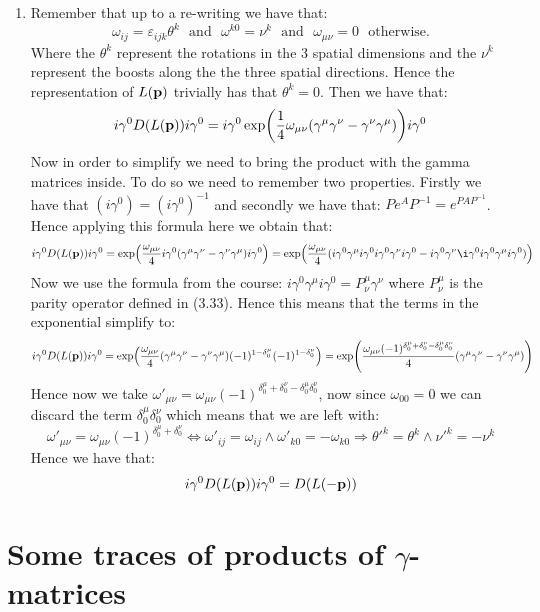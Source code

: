 \documentclass[10pt,a4paper]{article}
\begin{document}
\begin{enumerate}


\item Remember that up to a re-writing we have that:
\[
\omega_{ij} = \varepsilon_{i j k} \theta^k \mbox{~~and~~} \omega^{k0} = \nu^k \mbox{~~and~~} \omega_{\mu \nu} = 0 \mbox{~~otherwise.}
\]
Where the $\theta^k$ represent the rotations in the 3 spatial dimensions and the $\nu^k$ represent the boosts along the the three spatial directions. Hence the representation of $L(\vb{p})$ trivially has that $\theta^k = 0$. Then we have that:
\[
i \gamma^0 D(L(\vb{p})) i \gamma^0 = i \gamma^0 \exp( \frac{1}{4} \omega_{\mu \nu} (\gamma^\mu \gamma^\nu - \gamma^\nu \gamma^\mu) ) i \gamma^0
\] 
Now in order to simplify we need to bring the product with the gamma matrices inside. To do so we need to remember two properties. Firstly we have that $(i\gamma^0) = (i\gamma^0)^{-1}$ and secondly we have that: $P e^A P^{-1} = e^{P A P^{-1}}$. Hence applying this formula here we obtain that:
\[
i\gamma^0 D(L(\vb{p})) i \gamma^0 = \exp(\frac{\omega_{\mu \nu}}{4} i\gamma^0 (\gamma^\mu \gamma^\nu - \gamma^\nu \gamma^\mu) i\gamma^0   ) = \exp(\frac{\omega_{\mu \nu}}{4} (i \gamma^0 \gamma^\mu i \gamma^0 i \gamma^0 \gamma^\nu i \gamma^0 - i\gamma^0\gamma^\nu \i \gamma^ 0 i \gamma^0 \gamma^\mu i\gamma^0)   )
\] 
Now we use the formula from the course: $i\gamma^0 \gamma^\mu i \gamma^0 = P^\mu_\nu \gamma^\nu$ where $P^\mu_\nu$ is the parity operator defined in (3.33). Hence this means that the terms in the exponential simplify to:
\[
i\gamma^0 D(L(\vb{p})) i \gamma^0 = \exp(\frac{\omega_{\mu \nu}}{4}  (\gamma^\mu \gamma^\nu - \gamma^\nu \gamma^\mu) (-1)^{1 - \delta^\mu_0}  (-1)^{1 - \delta^\nu_0}) = \exp(\frac{\omega_{\mu \nu}(-1)^{\delta^\mu_0 + \delta^\nu_0 - \delta^\mu_0 \delta^\nu_0} }{4}  (\gamma^\mu \gamma^\nu - \gamma^\nu \gamma^\mu)) 
\]
Hence now we take $\omega'_{\mu \nu} = \omega_{\mu \nu}(-1)^{\delta^\mu_0 + \delta^\nu_0 - \delta^\mu_0 \delta^\nu_0}$, now since $\omega_{00} = 0$ we can discard the term $\delta^\mu_0 \delta^\nu_0$ which means that we are left with:
\[
\omega'_{\mu \nu } = \omega_{\mu \nu}(-1)^{\delta^\mu_0 + \delta^\nu_0} \Leftrightarrow \omega'_{ij} = \omega_{ij} \land \omega'_{k 0} = - \omega_{k 0} \Rightarrow \theta'^k = \theta^k \land \nu'^k = -\nu^k
\]
Hence we have that:
\[
i\gamma^0 D(L(\vb{p})) i \gamma^0 = D(L(-\vb{p}))
\]

\end{enumerate}


\section{Some traces of products of $\gamma$-matrices}
\end{document}
